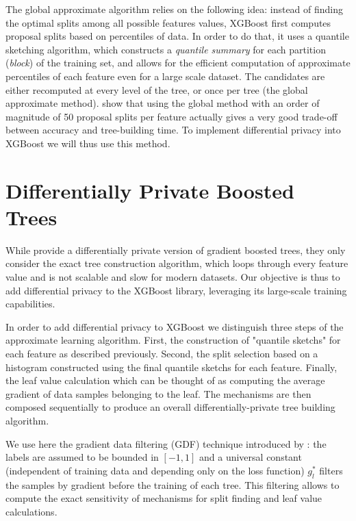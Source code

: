 \documentclass{article}
\theoremstyle{definition}
\begin{document}
The global approximate algorithm relies on the following idea: instead of finding the optimal splits among all possible features values, XGBoost first computes proposal splits based on percentiles of data. In order to do that, it uses a quantile sketching algorithm, which constructs a \textit{quantile summary} 
for each partition (\textit{block}) of the training set, and allows for the efficient computation of approximate percentiles of each feature even for a large scale dataset. The candidates are either recomputed at every level of the tree, or once per tree (the global approximate method). \cite{chen2016xgboost} show that using the global method with an order of magnitude of 50 proposal splits per feature actually gives a very good trade-off between accuracy and tree-building time. To implement differential privacy into XGBoost we will thus use this method. \smallskip 

\section{Differentially Private Boosted Trees} 

While \cite{li2020privacy} provide a differentially private version of gradient boosted trees, they only consider the exact tree construction algorithm, which loops through every feature value and is not scalable and slow for modern datasets. Our objective is thus to add differential privacy to the XGBoost library, leveraging its large-scale training capabilities. \smallskip 

In order to add differential privacy to XGBoost we distinguish three steps of the approximate learning algorithm. First, the 
construction of "quantile sketchs" for each feature as described previously. Second, the split selection based on a histogram
constructed using the final quantile sketchs for each feature. Finally, the leaf value calculation which can be thought of as computing
the average gradient of data samples belonging to the leaf. The mechanisms are then composed sequentially to produce an overall differentially-private tree building algorithm. \smallskip 

We use here the gradient data filtering (GDF) technique introduced by \cite{li2020privacy}: the labels are assumed to be bounded in $[-1,1]$ and a universal constant (independent of training data and depending only on the loss function) $g_l^{*}$ filters the samples by gradient before the training of each tree. This filtering allows to compute the exact sensitivity of mechanisms for split finding and leaf value calculations. \smallskip 
\end{document}
